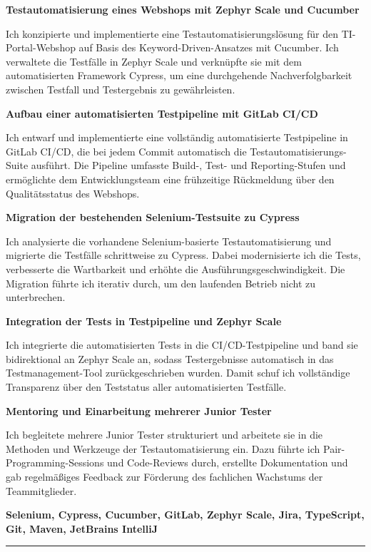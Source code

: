 \documentclass[9pt,a4paper]{article}
\newcommand{\phresptitle}[1]{{\fontsize{7.5}{8.4}\selectfont\bfseries #1\par}}
\newcommand{\phrespdesc}[1]{{\color{mutedfg}\fontsize{7}{8.2}\selectfont #1\par}}
\newcommand{\phtoolline}[1]{{\color{accent}\fontsize{6.8}{7.6}\selectfont\bfseries #1\par}}
\begin{document}
\vspace{0.5mm}
\phresptitle{Testautomatisierung eines Webshops mit Zephyr Scale und Cucumber}
\phrespdesc{Ich konzipierte und implementierte eine Testautomatisierungslösung für den TI-Portal-Webshop auf Basis des Keyword-Driven-Ansatzes mit Cucumber. Ich verwaltete die Testfälle in Zephyr Scale und verknüpfte sie mit dem automatisierten Framework Cypress, um eine durchgehende Nachverfolgbarkeit zwischen Testfall und Testergebnis zu gewährleisten.}
\vspace{0.8mm}
\phresptitle{Aufbau einer automatisierten Testpipeline mit GitLab CI/CD}
\phrespdesc{Ich entwarf und implementierte eine vollständig automatisierte Testpipeline in GitLab CI/CD, die bei jedem Commit automatisch die Testautomatisierungs-Suite ausführt. Die Pipeline umfasste Build-, Test- und Reporting-Stufen und ermöglichte dem Entwicklungsteam eine frühzeitige Rückmeldung über den Qualitätsstatus des Webshops.}
\vspace{0.8mm}
\phresptitle{Migration der bestehenden Selenium-Testsuite zu Cypress}
\phrespdesc{Ich analysierte die vorhandene Selenium-basierte Testautomatisierung und migrierte die Testfälle schrittweise zu Cypress. Dabei modernisierte ich die Tests, verbesserte die Wartbarkeit und erhöhte die Ausführungsgeschwindigkeit. Die Migration führte ich iterativ durch, um den laufenden Betrieb nicht zu unterbrechen.}
\vspace{0.8mm}
\phresptitle{Integration der Tests in Testpipeline und Zephyr Scale}
\phrespdesc{Ich integrierte die automatisierten Tests in die CI/CD-Testpipeline und band sie bidirektional an Zephyr Scale an, sodass Testergebnisse automatisch in das Testmanagement-Tool zurückgeschrieben wurden. Damit schuf ich vollständige Transparenz über den Teststatus aller automatisierten Testfälle.}
\vspace{0.8mm}
\phresptitle{Mentoring und Einarbeitung mehrerer Junior Tester}
\phrespdesc{Ich begleitete mehrere Junior Tester strukturiert und arbeitete sie in die Methoden und Werkzeuge der Testautomatisierung ein. Dazu führte ich Pair-Programming-Sessions und Code-Reviews durch, erstellte Dokumentation und gab regelmäßiges Feedback zur Förderung des fachlichen Wachstums der Teammitglieder.}
\vspace{0.8mm}

\phtoolline{Selenium, Cypress, Cucumber, GitLab, Zephyr Scale, Jira, TypeScript, Git, Maven, JetBrains IntelliJ}

\vspace{1.5mm}
{\color{rulefg}\rule{\linewidth}{0.25pt}\par}
\vspace{2.5mm}
\end{document}
